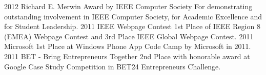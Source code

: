 \documentclass[]{friggeri-cv}
\begin{document}
\begin{entrylist}
  \entry
    {2012}
    {Richard E. Merwin Award by IEEE Computer Society}
    {}
    {For demonstrating outstanding involvement in IEEE Computer Society, for Academic Excellence and for Student Leadership.}
  \entry
    {2011}
    {IEEE Webpage Contest}
    {}
    {1st Place of IEEE Region 8 (EMEA) Webpage Contest and 3rd Place IEEE Global Webpage Contest.}
  \entry
    {2011}
    {Microsoft}
    {}
    {1st Place at Windows Phone App Code Camp by Microsoft in 2011.}
  \entry
    {2011}
    {BET - Bring Entrepreneurs Together}
    {}
    {2nd Place with honorable award at Google Case Study Competition in BET24 Entrepreneurs Challenge.}    
\end{entrylist}

\end{document}
